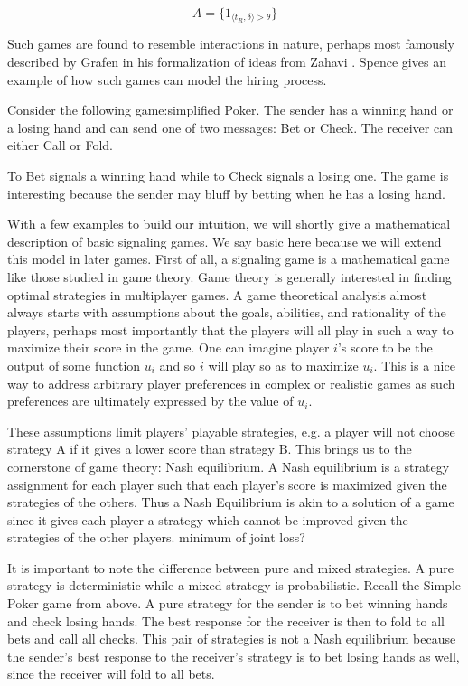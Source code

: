 \documentclass{article}
\begin{document}
\begin{equation}
	A = \lbrace 1_{\langle t_R, \delta \rangle > \theta} \rbrace
\end{equation}

Such games are found to resemble interactions in nature, perhaps most famously described by Grafen \cite{grafen1} in his formalization of ideas from Zahavi \cite{zahavi1}. Spence \cite{spence1} gives an example of how such games can model the hiring process.

Consider the following game:simplified Poker. The sender has a winning hand or a losing hand and can send one of two messages: Bet or Check. The receiver can either Call or Fold.

To Bet signals a winning hand while to Check signals a losing one. The game is interesting because the sender may bluff by betting when he has a losing hand. 

With a few examples to build our intuition, we will shortly give a mathematical description of basic signaling games. We say basic here because we will extend this model in later games. First of all, a signaling game is a mathematical game like those studied in game theory. Game theory is generally interested in finding optimal strategies in multiplayer games. A game theoretical analysis almost always starts with assumptions about the goals, abilities, and rationality of the players, perhaps most importantly that the players will all play in such a way to maximize their score in the game. One can imagine player $i$'s score to be the output of some function $u_i$ and so $i$ will play so as to maximize $u_i$. This is a nice way to address arbitrary player preferences in complex or realistic games as such preferences are ultimately expressed by the value of $u_i$. 

These assumptions limit players' playable strategies, e.g. a player will not choose strategy A if it gives a lower score than strategy B. This brings us to the cornerstone of game theory: Nash equilibrium. A Nash equilibrium is a strategy assignment for each player such that each player's score is maximized given the strategies of the others. Thus a Nash Equilibrium is akin to a solution of a game since it gives each player a strategy which cannot be improved given the strategies of the other players. minimum of joint loss?

It is important to note the difference between pure and mixed strategies. A pure strategy is deterministic while a mixed strategy is probabilistic. Recall the Simple Poker game from above. A pure strategy for the sender is to bet winning hands and check losing hands. The best response for the receiver is then to fold to all bets and call all checks. This pair of strategies is not a Nash equilibrium because the sender's best response to the receiver's strategy is to bet losing hands as well, since the receiver will fold to all bets. 
\end{document}
